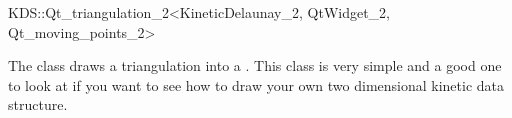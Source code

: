 

\begin{ccRefClass}{KDS::Qt_triangulation_2<KineticDelaunay_2, QtWidget_2, Qt_moving_points_2>}  %


\ccDefinition
  
The class draws a triangulation into a . This class is
very simple and a good one to look at if you want to see how to draw
your own two dimensional kinetic data structure.


\ccCreation
{}  %



\end{ccRefClass}


